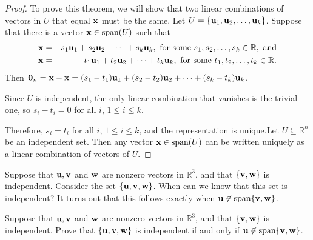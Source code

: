 \begin{proof}
To prove this theorem, we will show that two linear combinations of vectors in $U$ that equal ${\bf x}$ must be the same. Let $U =\{ {\bf u}_1, {\bf u}_2, \ldots, {\bf u}_k\}$.
Suppose that there is a vector ${\bf x}\in \mbox{span}(U)$ such that
\begin{eqnarray*}
{\bf x} & = & s_1{\bf u}_1 + s_2{\bf u}_2 + \cdots + s_k{\bf u}_k,
\mbox{ for some } s_1, s_2, \ldots, s_k\in\mathbb{R}, \mbox{ and} \\
{\bf x} & = & t_1{\bf u}_1 + t_2{\bf u}_2 + \cdots + t_k{\bf u}_k,
\mbox{ for some } t_1, t_2, \ldots, t_k\in\mathbb{R}.
\end{eqnarray*}
Then 
${\bf 0}_n={\bf x}-{\bf x} = (s_1-t_1){\bf u}_1 + (s_2-t_2){\bf u}_2 + \cdots +
(s_k-t_k){\bf u}_k$.

Since $U$ is independent, the only linear combination that vanishes
is the trivial one, so $s_i-t_i=0$ for all $i$, $1\leq i\leq k$.

Therefore, $s_i=t_i$ for all $i$, $1\leq i\leq k$, and the
representation is unique.Let $U \subseteq\mathbb{R}^n$ be an independent set.
Then any vector ${\bf x}\in\mbox{span}(U)$ can be written uniquely as a linear combination of vectors of $U$.
\end{proof}

Suppose that ${\bf u},{\bf v}$ and ${\bf w}$ are nonzero vectors in $\mathbb{R}^3$,
and that $\{ {\bf v},{\bf w}\}$ is independent. Consider the set $\{ {\bf u},{\bf v},{\bf w}\}$. When can we know that this set is independent? It turns out that this follows exactly when ${\bf u}\not\in\mbox{span}\{{\bf v},{\bf w}\}$.

\begin{example}{}{}
Suppose that ${\bf u},{\bf v}$ and ${\bf w}$ are nonzero vectors in $\mathbb{R}^3$,
and that $\{ {\bf v},{\bf w}\}$ is independent.
Prove that $\{ {\bf u},{\bf v},{\bf w}\}$ is independent if and only if 
${\bf u}\not\in\mbox{span}\{{\bf v},{\bf w}\}$.
\end{example}


